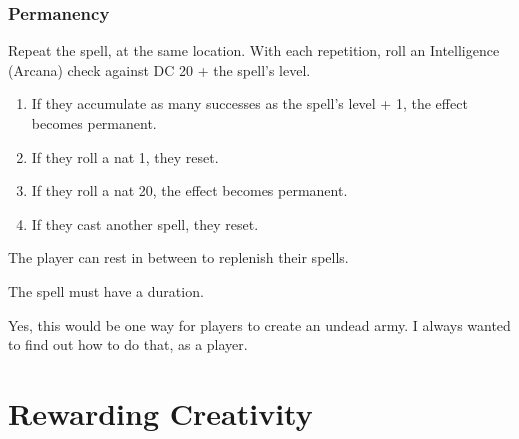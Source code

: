 \documentclass[twocolumn]{dndbook}
\begin{document}
\subsection{Permanency}


Repeat the spell, at the same location. With each repetition, roll an Intelligence (Arcana) check against DC 20 + the spell's level.
\begin{enumerate}
	\item If they accumulate as many successes as the spell's level + 1, the effect becomes permanent.
	\item If they roll a nat 1, they reset.
	\item If they roll a nat 20, the effect becomes permanent.
	\item If they cast another spell, they reset.
\end{enumerate}

The player can rest in between to replenish their spells.

The spell must have a duration.\par

Yes, this would be one way for players to create an undead army.
I always wanted to find out how to do that, as a player.\par







\chapter{Rewarding Creativity}

\end{document}
